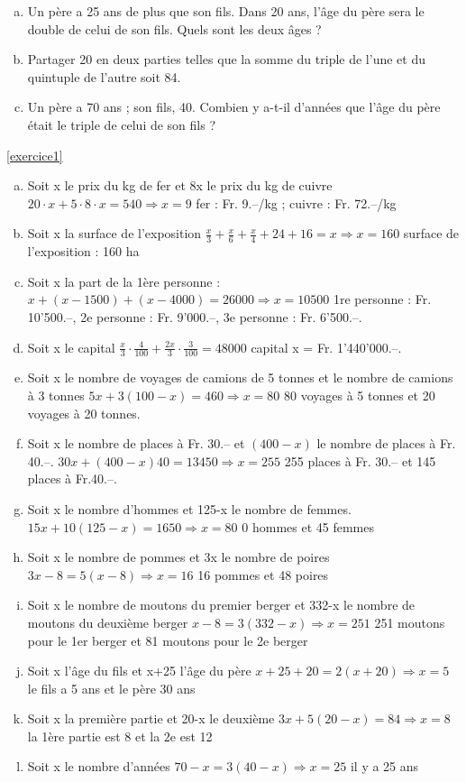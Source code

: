 \documentclass[12pt, addpoints]{exam}
\begin{document}
\begin{exercice}
\begin{enumerate}[a)]
\item Un père a 25 ans de plus que son fils. Dans 20 ans, l'âge du père sera le double de celui de son fils. Quels sont les deux âges ?

\item Partager 20 en deux parties telles que la somme du triple de l'une et du quintuple de l'autre soit 84.

\item Un père a 70 ans ; son fils, 40. Combien y a-t-il d'années que l'âge du père était le triple de celui de son fils ?
\end{enumerate}
\end{exercice}

\newpage

\begin{solutions}{\ref{exercice1}}
\begin{enumerate}[a)]
\item Soit x le prix du kg de fer et 8x le prix du kg de cuivre
	$20\cdot x+5\cdot 8\cdot x=540\Rightarrow x=9$	fer : Fr. 9.–/kg ; cuivre : Fr. 72.–/kg
\item Soit x la surface de l'exposition $\frac{x}{3}+\frac{x}{6}+\frac{x}{4}+24+16=x\Rightarrow x=160$  
	surface de l'exposition : 160 ha
\item Soit x la part de la 1ère  personne : $x+(x-1500)+(x-4000)=26000\Rightarrow x=10500$
	1re personne : Fr. 10'500.–,   2e personne : Fr. 9'000.–, 3e personne : Fr. 6'500.–.
\item Soit x le capital $\frac{x}{3}\cdot \frac{4}{100}+\frac{2x}{3}\cdot \frac{3}{100}=48000$	capital x = Fr. 1'440'000.–.
\item Soit x le nombre de voyages de camions de 5 tonnes et le nombre de camions à 3 tonnes
	$5x+3(100-x)=460\Rightarrow x=80$	80 voyages à 5 tonnes et 20 voyages à 20 tonnes.
\item Soit x le nombre de places à Fr. 30.–  et $\left( 400-x \right)$  le nombre de places à Fr. 40.–.
	$30x+(400-x)40=13450\Rightarrow x=255$	255 places à Fr. 30.– et 145 places à Fr.40.–.
\item Soit x le nombre d’hommes et 125-x le nombre de femmes.
	$15x+10\left( 125-x \right)=1650\Rightarrow x=80$	0 hommes et 45 femmes
\item Soit x le nombre de pommes et 3x le nombre de poires
	$3x-8=5\left( x-8 \right)\Rightarrow x=16$	16 pommes et 48 poires
\item Soit x le nombre de moutons du premier berger et 332-x le nombre de moutons du deuxième berger
	$x-8=3\left( 332-x \right)\Rightarrow x=251$	251 moutons pour le 1er berger et 81 moutons pour le 2e berger
\item Soit x l’âge du fils et x+25 l’âge du père
	$x+25+20=2\left( x+20 \right)\Rightarrow x=5$	le fils a 5 ans et le père 30 ans
\item Soit x la première partie et 20-x le deuxième
	$3x+5\left( 20-x \right)=84\Rightarrow x=8$	la 1ère partie est 8 et la 2e est 12
\item Soit x le nombre d’années
	$70-x=3\left( 40-x \right)\Rightarrow x=25$	il y a 25 ans
\end{enumerate}
\end{solutions}
\end{document}
